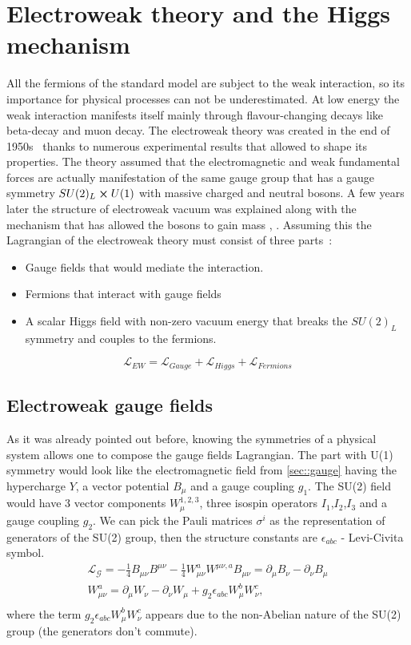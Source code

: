 \section{Electroweak theory and the Higgs mechanism}
All the fermions of the standard model are subject to the weak interaction, so its importance for physical processes can not be underestimated. At low energy the weak interaction manifests itself mainly through flavour-changing decays like beta-decay and muon decay. The electroweak theory was created in the end of 1950s~\cite{Glashow:1959wxa} \cite{weinberg} \cite{Salam1959} thanks to numerous experimental results that allowed to shape its properties. The theory assumed that the electromagnetic and weak fundamental forces are actually manifestation of the same gauge group that has a gauge symmetry $SU(2)_L \cross U(1)$ with massive charged and neutral bosons. A few years later the structure of electroweak vacuum was explained along with the mechanism that has allowed the bosons to gain mass \cite{brout}, \cite{higgs}. Assuming this the Lagrangian of the electroweak theory must consist of three parts~\cite{Hollik_2006}: 
\begin{itemize}
	\item Gauge fields that would mediate the interaction.
	\item Fermions that interact with gauge fields
	\item A scalar Higgs field with non-zero vacuum energy that breaks the $SU(2)_L$ symmetry and couples to the fermions.
\end{itemize}
 \begin{equation}
\mathcal{L}_{EW} = \mathcal{L}_{Gauge} +\mathcal{L}_{Higgs} +\mathcal{L}_{Fermions}
\end{equation}
\subsection{Electroweak gauge fields}
\label{sec::ewk}
As it was already pointed out before, knowing the symmetries of a physical system allows one to compose the gauge fields Lagrangian. The part with U(1) symmetry would look like the electromagnetic field from \ref{sec::gauge} having the hypercharge $Y$, a vector potential $B_{\mu}$ and a gauge coupling $g_1$. The SU(2) field would have 3 vector components $W^{1,2,3}_{\mu}$, three isospin operators $I_1$,$I_2$,$I_3$ and a gauge coupling $g_2$. We can pick the Pauli matrices $\sigma^{i}$ as the representation of generators of the SU(2) group, then the structure constants are $\epsilon_{abc}$ - Levi-Civita symbol.
\begin{equation}
\begin{array}{lcl} 
\mathcal{L_{G}} =  -\frac{1}{4}B_{\mu \nu}B^{\mu \nu} -\frac{1}{4}W^a_{\mu \nu}W^{\mu \nu,a} 
B_{\mu \nu}  =\partial_{\mu}B_{\nu} - \partial_{\nu}B_{\mu}\\ 
W^a_{\mu \nu}  =\partial_{\mu}W_{\nu} - \partial_{\nu}W_{\mu}+g_2\epsilon_{abc}W^b_{\mu}W^c_{\nu},\\ 
\end{array} 
\end{equation}
where the term $g_2\epsilon_{abc}W^b_{\mu}W^c_{\nu}$ appears due to the non-Abelian nature of the SU(2) group (the generators don't commute).


